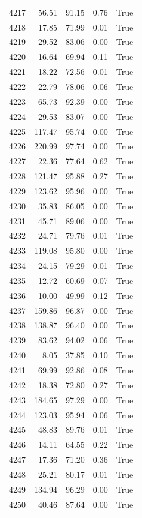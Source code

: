 \begin{longtable}{rrrrr}
4217 & 56.51 & 91.15 & 0.76 & True \\
4218 & 17.85 & 71.99 & 0.01 & True \\
4219 & 29.52 & 83.06 & 0.00 & True \\
4220 & 16.64 & 69.94 & 0.11 & True \\
4221 & 18.22 & 72.56 & 0.01 & True \\
4222 & 22.79 & 78.06 & 0.06 & True \\
4223 & 65.73 & 92.39 & 0.00 & True \\
4224 & 29.53 & 83.07 & 0.00 & True \\
4225 & 117.47 & 95.74 & 0.00 & True \\
4226 & 220.99 & 97.74 & 0.00 & True \\
4227 & 22.36 & 77.64 & 0.62 & True \\
4228 & 121.47 & 95.88 & 0.27 & True \\
4229 & 123.62 & 95.96 & 0.00 & True \\
4230 & 35.83 & 86.05 & 0.00 & True \\
4231 & 45.71 & 89.06 & 0.00 & True \\
4232 & 24.71 & 79.76 & 0.01 & True \\
4233 & 119.08 & 95.80 & 0.00 & True \\
4234 & 24.15 & 79.29 & 0.01 & True \\
4235 & 12.72 & 60.69 & 0.07 & True \\
4236 & 10.00 & 49.99 & 0.12 & True \\
4237 & 159.86 & 96.87 & 0.00 & True \\
4238 & 138.87 & 96.40 & 0.00 & True \\
4239 & 83.62 & 94.02 & 0.06 & True \\
4240 & 8.05 & 37.85 & 0.10 & True \\
4241 & 69.99 & 92.86 & 0.08 & True \\
4242 & 18.38 & 72.80 & 0.27 & True \\
4243 & 184.65 & 97.29 & 0.00 & True \\
4244 & 123.03 & 95.94 & 0.06 & True \\
4245 & 48.83 & 89.76 & 0.01 & True \\
4246 & 14.11 & 64.55 & 0.22 & True \\
4247 & 17.36 & 71.20 & 0.36 & True \\
4248 & 25.21 & 80.17 & 0.01 & True \\
4249 & 134.94 & 96.29 & 0.00 & True \\
4250 & 40.46 & 87.64 & 0.00 & True \\

\end{longtable}
